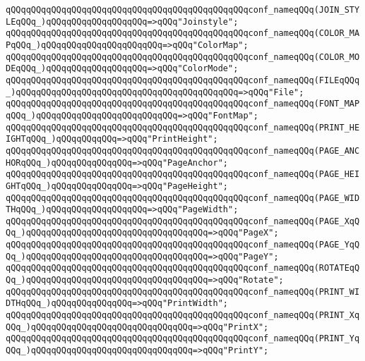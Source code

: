 \verb|qQQqqQQqqQQqqQQqqQQqqQQqqQQqqQQqqQQqqQQqqQQqqQQqconf_nameqQQq(JOIN_STYLEqQQq_)qQQqqQQqqQQqqQQqqQQq=>qQQq"Joinstyle";|\newline
\verb|qQQqqQQqqQQqqQQqqQQqqQQqqQQqqQQqqQQqqQQqqQQqqQQqconf_nameqQQq(COLOR_MAPqQQq_)qQQqqQQqqQQqqQQqqQQqqQQq=>qQQq"ColorMap";|\newline
\verb|qQQqqQQqqQQqqQQqqQQqqQQqqQQqqQQqqQQqqQQqqQQqqQQqconf_nameqQQq(COLOR_MODEqQQq_)qQQqqQQqqQQqqQQqqQQq=>qQQq"ColorMode";|\newline
\verb|qQQqqQQqqQQqqQQqqQQqqQQqqQQqqQQqqQQqqQQqqQQqqQQqconf_nameqQQq(FILEqQQq_)qQQqqQQqqQQqqQQqqQQqqQQqqQQqqQQqqQQqqQQqqQQq=>qQQq"File";|\newline
\verb|qQQqqQQqqQQqqQQqqQQqqQQqqQQqqQQqqQQqqQQqqQQqqQQqconf_nameqQQq(FONT_MAPqQQq_)qQQqqQQqqQQqqQQqqQQqqQQqqQQq=>qQQq"FontMap";|\newline
\verb|qQQqqQQqqQQqqQQqqQQqqQQqqQQqqQQqqQQqqQQqqQQqqQQqconf_nameqQQq(PRINT_HEIGHTqQQq_)qQQqqQQqqQQq=>qQQq"PrintHeight";|\newline
\verb|qQQqqQQqqQQqqQQqqQQqqQQqqQQqqQQqqQQqqQQqqQQqqQQqconf_nameqQQq(PAGE_ANCHORqQQq_)qQQqqQQqqQQqqQQq=>qQQq"PageAnchor";|\newline
\verb|qQQqqQQqqQQqqQQqqQQqqQQqqQQqqQQqqQQqqQQqqQQqqQQqconf_nameqQQq(PAGE_HEIGHTqQQq_)qQQqqQQqqQQqqQQq=>qQQq"PageHeight";|\newline
\verb|qQQqqQQqqQQqqQQqqQQqqQQqqQQqqQQqqQQqqQQqqQQqqQQqconf_nameqQQq(PAGE_WIDTHqQQq_)qQQqqQQqqQQqqQQqqQQq=>qQQq"PageWidth";|\newline
\verb|qQQqqQQqqQQqqQQqqQQqqQQqqQQqqQQqqQQqqQQqqQQqqQQqconf_nameqQQq(PAGE_XqQQq_)qQQqqQQqqQQqqQQqqQQqqQQqqQQqqQQqqQQq=>qQQq"PageX";|\newline
\verb|qQQqqQQqqQQqqQQqqQQqqQQqqQQqqQQqqQQqqQQqqQQqqQQqconf_nameqQQq(PAGE_YqQQq_)qQQqqQQqqQQqqQQqqQQqqQQqqQQqqQQqqQQq=>qQQq"PageY";|\newline
\verb|qQQqqQQqqQQqqQQqqQQqqQQqqQQqqQQqqQQqqQQqqQQqqQQqconf_nameqQQq(ROTATEqQQq_)qQQqqQQqqQQqqQQqqQQqqQQqqQQqqQQqqQQq=>qQQq"Rotate";|\newline
\verb|qQQqqQQqqQQqqQQqqQQqqQQqqQQqqQQqqQQqqQQqqQQqqQQqconf_nameqQQq(PRINT_WIDTHqQQq_)qQQqqQQqqQQqqQQq=>qQQq"PrintWidth";|\newline
\verb|qQQqqQQqqQQqqQQqqQQqqQQqqQQqqQQqqQQqqQQqqQQqqQQqconf_nameqQQq(PRINT_XqQQq_)qQQqqQQqqQQqqQQqqQQqqQQqqQQqqQQq=>qQQq"PrintX";|\newline
\verb|qQQqqQQqqQQqqQQqqQQqqQQqqQQqqQQqqQQqqQQqqQQqqQQqconf_nameqQQq(PRINT_YqQQq_)qQQqqQQqqQQqqQQqqQQqqQQqqQQqqQQq=>qQQq"PrintY";|\newline
